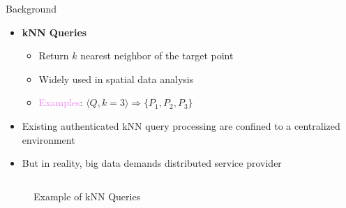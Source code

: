 \documentclass[xcolor={dvipsnames},aspectratio=169,10pt]{beamer}
\begin{document}
\begin{frame}{Background}
  \begin{itemize}[<+->]
    \item \textbf{kNN Queries}
      \begin{itemize}[<1->]
        \item Return $k$ nearest neighbor of the target point
        \item Widely used in spatial data analysis
        \item \textcolor{Violet}{Examples}: $\langle Q, k=3\rangle \Rightarrow \{ P_1, P_2, P_3 \}$
      \end{itemize}
    \item Existing authenticated kNN query processing are confined to a centralized environment
    \item But in reality, big data demands distributed service provider
  \end{itemize}

  \begin{columns}[b,onlytextwidth]
    \begin{column}{0.4\linewidth}
      \begin{figure}
        \scalebox{0.65}{}
        \caption{Example of kNN Queries}
      \end{figure}
    \end{column}
    \begin{column}{0.6\linewidth}
      \begin{figure}
      \end{figure}
    \end{column}
  \end{columns}
\end{frame}
\end{document}
